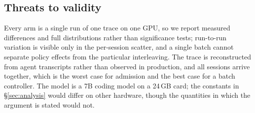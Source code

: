 
\subsection{Threats to validity}
\label{sec:eval-threats}

Every arm is a single run of one trace on one GPU, so we report measured differences and
full distributions rather than significance tests; run-to-run variation is visible only in
the per-session scatter, and a single batch cannot separate policy effects from the
particular interleaving. The trace is reconstructed from agent transcripts rather than
observed in production, and all sessions arrive together, which is the worst case for
admission and the best case for a batch controller. The model is a 7B coding model on a
24\,GB card; the constants in \S\ref{sec:analysis} would differ on other hardware, though
the quantities in which the argument is stated would not.
